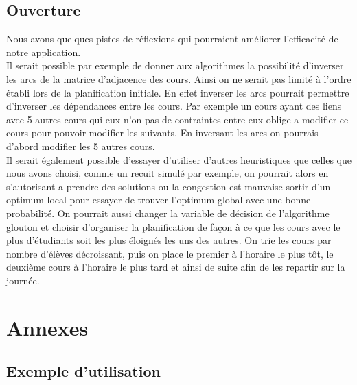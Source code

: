 \documentclass[a4paper,11pt]{article}
\begin{document}
	\subsection{Ouverture}
		Nous avons quelques pistes de réflexions qui pourraient améliorer l'efficacité de notre application.\\
		Il serait possible par exemple de donner aux algorithmes la possibilité d'inverser les arcs de la matrice d'adjacence des cours. Ainsi on ne serait pas limité à l'ordre établi lors de la planification initiale. En effet inverser les arcs pourrait permettre d'inverser les dépendances entre les cours. Par exemple un cours ayant des liens avec 5 autres cours qui eux n'on pas de contraintes entre eux oblige a modifier ce cours pour pouvoir modifier les suivants. En inversant les arcs on pourrais d'abord modifier les 5 autres cours. \\
		Il serait également possible d'essayer d'utiliser d'autres heuristiques que celles que nous avons choisi, comme un recuit simulé par exemple, on pourrait alors en s'autorisant a prendre des solutions ou la congestion est mauvaise sortir d'un optimum local pour essayer de trouver l'optimum global avec une bonne probabilité. On pourrait aussi changer la variable de décision de l'algorithme glouton et choisir d'organiser la planification de façon à ce que les cours avec le plus d'étudiants soit les plus éloignés les uns des autres. On trie les cours par nombre d'élèves décroissant, puis on place le premier à l'horaire le plus tôt, le deuxième cours à l'horaire le plus tard et ainsi de suite afin de les repartir sur la journée.

\newpage
\section{Annexes}
	\subsection{Exemple d'utilisation}
\end{document}
